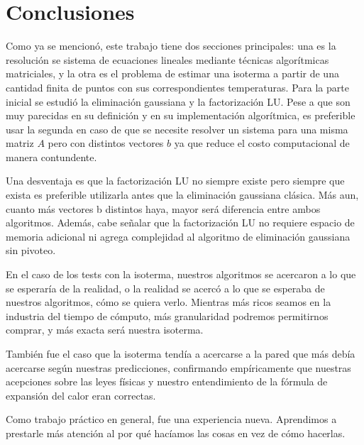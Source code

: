 \section{Conclusiones}
Como ya se mencionó, este trabajo tiene dos secciones principales: una es la resolución se sistema de 
ecuaciones lineales mediante técnicas algorítmicas matriciales, y la otra es el problema de estimar una 
isoterma a partir de una cantidad finita de puntos con sus correspondientes temperaturas. Para la parte 
inicial se estudió la eliminación gaussiana y la factorización LU. Pese a que son muy 
parecidas en su definición y en su implementación algorítmica, es preferible usar la segunda en caso
de que se necesite resolver un sistema para una misma matriz $A$ pero con distintos vectores $b$ 
ya que reduce el costo computacional de manera contundente. 

Una desventaja es que la factorización LU no siempre existe pero siempre que exista es
preferible utilizarla antes que la eliminación gaussiana clásica. Más aun, cuanto más vectores 
b distintos haya, mayor será diferencia entre ambos algoritmos. Además, cabe señalar que la factorización LU no requiere espacio de memoria adicional ni agrega complejidad al algoritmo de eliminación gaussiana sin pivoteo.

En el caso de los tests con la isoterma, nuestros algoritmos se acercaron a lo que se esperaría de
la realidad, o la realidad se acercó a lo que se esperaba de nuestros algoritmos, cómo se quiera
verlo. Mientras más ricos seamos en la industria del tiempo de cómputo, más granularidad podremos
permitirnos comprar, y más exacta será nuestra isoterma.

También fue el caso que la isoterma tendía a acercarse a la pared que más debía acercarse según
nuestras predicciones, confirmando empíricamente que nuestras acepciones sobre las leyes físicas y
nuestro entendimiento de la fórmula de expansión del calor eran correctas.

Como trabajo práctico en general, fue una experiencia nueva. Aprendimos a prestarle más atención al
por qué hacíamos las cosas en vez de cómo hacerlas.




